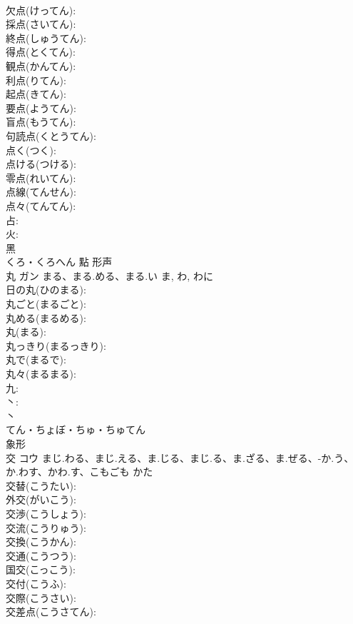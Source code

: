 \documentclass[8pt]{extreport}
\begin{document}
\begin{CJK}{UTF8}{min}
\\	欠点(けってん): 
\\	採点(さいてん): 
\\	終点(しゅうてん): 
\\	得点(とくてん): 
\\	観点(かんてん): 
\\	利点(りてん): 
\\	起点(きてん): 
\\	要点(ようてん): 
\\	盲点(もうてん): 
\\	句読点(くとうてん): 
\\	点く(つく): 
\\	点ける(つける): 
\\	零点(れいてん): 
\\	点線(てんせん): 
\\	点々(てんてん): 
\\	占: 
\\	火: 
\\	黑	
\\	くろ・くろへん	點	形声 
\\	丸	ガン	まる、まる.める、まる.い	ま, わ, わに	
\\	日の丸(ひのまる): 
\\	丸ごと(まるごと): 
\\	丸める(まるめる): 
\\	丸(まる): 
\\	丸っきり(まるっきり): 
\\	丸で(まるで): 
\\	丸々(まるまる): 
\\	九: 
\\	丶: 
\\	丶	
\\	てん・ちょぼ・ちゅ・ちゅてん	
\\	象形 
\\	交	コウ	まじ.わる、まじ.える、ま.じる、まじ.る、ま.ざる、ま.ぜる、-か.う、か.わす、かわ.す、こもごも	かた	
\\	交替(こうたい): 
\\	外交(がいこう): 
\\	交渉(こうしょう): 
\\	交流(こうりゅう): 
\\	交換(こうかん): 
\\	交通(こうつう): 
\\	国交(こっこう): 
\\	交付(こうふ): 
\\	交際(こうさい): 
\\	交差点(こうさてん): 

\end{CJK}
\end{document}
